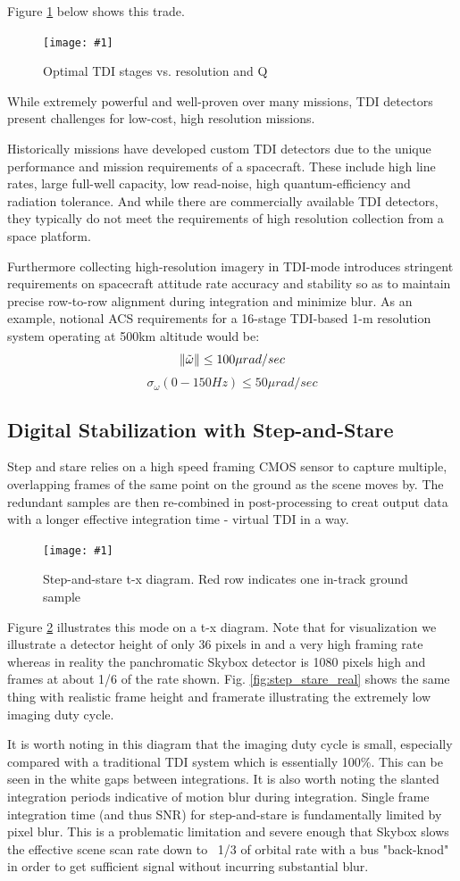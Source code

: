 \documentclass[10pt,journal]{IEEEtran}  %
\newcommand{\includefigure}[3]
{
  \begin{figure}[h!]
  \centering
  \texttt{[image: \#1]}
  \caption[]{#3}
  \label{#2}
  \end{figure}
}
\DeclarePairedDelimiter{\norm}{\lVert}{\rVert}
\begin{document}
Figure \ref{fig:n_tdi} below shows this trade.

\includefigure{figures/N_tdi.pgf}{fig:n_tdi}{Optimal TDI stages vs. resolution and Q}

While extremely powerful and well-proven over many missions, TDI detectors present challenges for low-cost, high resolution missions.

Historically missions have developed custom TDI detectors due to the unique performance and mission requirements of a spacecraft\cite{jerram}.  These include high line rates, large full-well capacity, low read-noise, high quantum-efficiency and radiation tolerance.  And while there are commercially available TDI detectors, they typically do not meet the requirements of high resolution collection from a space platform.

Furthermore collecting high-resolution imagery in TDI-mode introduces stringent requirements on spacecraft attitude rate accuracy and stability so as to maintain precise row-to-row alignment during integration and minimize blur. As an example, notional ACS requirements for a 16-stage TDI-based 1-m resolution system operating at 500km altitude would be\cite{pittelkau}:
$$\norm{\tilde{\omega}} \leq 100 \mu rad / sec$$
$$\sigma_{\omega}(0-150Hz) \leq 50 \mu rad/sec$$

\subsection{Digital Stabilization with Step-and-Stare}
Step and stare relies on a high speed framing CMOS sensor to capture multiple, overlapping frames of the same point on the ground as the scene moves by.  The redundant samples are then re-combined in post-processing to creat output data with a longer effective integration time - virtual TDI in a way.

\includefigure{figures/step_stare.pgf}{fig:step_stare}{Step-and-stare t-x diagram.  Red row indicates one in-track ground sample}

Figure \ref{fig:step_stare} illustrates this mode on a t-x diagram.  Note that for visualization we illustrate a detector height of only 36 pixels in and a very high framing rate whereas in reality the panchromatic Skybox detector is 1080 pixels high and frames at about 1/6 of the rate shown.  Fig. \ref{fig:step_stare_real} shows the same thing with realistic frame height and framerate illustrating the extremely low imaging duty cycle.

It is worth noting in this diagram that the imaging duty cycle is small, especially compared with a traditional TDI system which is essentially 100\%.  This can be seen in the white gaps between integrations.  It is also worth noting the slanted integration periods indicative of motion blur during integration.  Single frame integration time (and thus SNR) for step-and-stare is fundamentally limited by pixel blur.  This is a problematic limitation and severe enough that Skybox slows the effective scene scan rate down to ~1/3 of orbital rate with a bus "back-knod" in order to get sufficient signal without incurring substantial blur.
\end{document}
